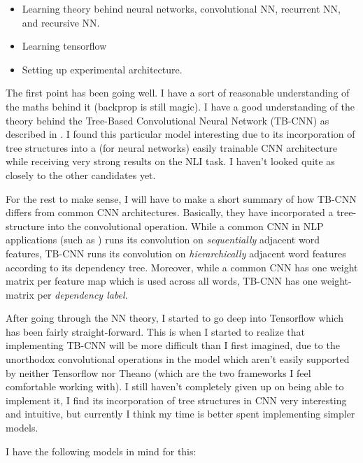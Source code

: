 \begin{itemize}
	\item Learning theory behind neural networks, convolutional NN, recurrent NN, and recursive NN.
	\item Learning tensorflow
	\item Setting up experimental architecture.
\end{itemize}

The first point has been going well. I have a sort of reasonable understanding of the maths behind it (backprop is still magic). I have a good understanding of the theory behind the Tree-Based Convolutional Neural Network (TB-CNN) as described in \cite{mou_recognizing_2015}. I found this particular model interesting due to its incorporation of tree structures into a (for neural networks) easily trainable CNN architecture while receiving very strong results on the NLI task. I haven't looked quite as closely to the other candidates yet.

For the rest to make sense, I will have to make a short summary of how TB-CNN differs from common CNN architectures. Basically, they have incorporated a tree-structure into the convolutional operation. While a common CNN in NLP applications (such as \cite{kim_convolutional_2014}) runs its convolution on \emph{sequentially} adjacent word features, TB-CNN runs its convolution on \emph{hierarchically} adjacent word features according to its dependency tree. Moreover, while a common CNN has one weight matrix per feature map which is used across all words, TB-CNN has one weight-matrix per \emph{dependency label}.

After going through the NN theory, I started to go deep into Tensorflow which has been fairly straight-forward. This is when I started to realize that implementing TB-CNN will be more difficult than I first imagined, due to the unorthodox convolutional operations in the model which aren't easily supported by neither Tensorflow nor Theano (which are the two frameworks I feel comfortable working with). I still haven't completely given up on being able to implement it, I find its incorporation of tree structures in CNN very interesting and intuitive, but currently I think my time is better spent implementing simpler models.

I have the following models in mind for this:

